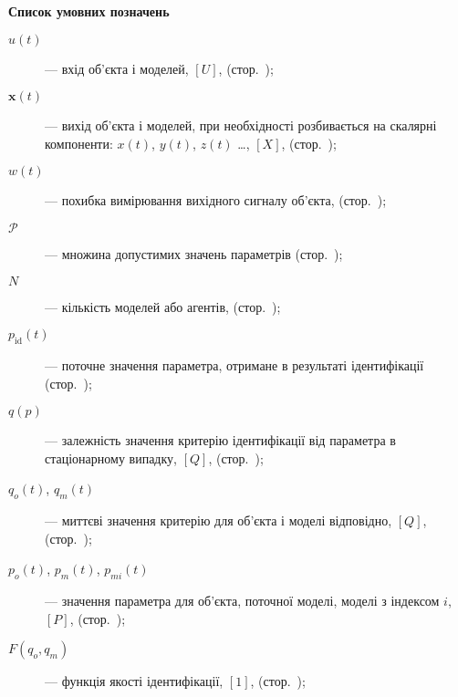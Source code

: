 \clearpage
{}

\begin{center}
\textbf{Список умовних позначень}
\end{center}


\begin{description}

  \item[$u(t)$]  ---
    вхід об'єкта і моделей,
    $[U]$, (стор.~\pageref{atu:d:u});

  \item[$\mathbf{x}(t)$]  ---
  вихід об'єкта і моделей, при необхідності розбивається на скалярні компоненти:
    $x(t)$, $y(t)$, $z(t)$ \ldots, $[X]$, (стор.~\pageref{atu:d:x});

  \item[$w(t)$]  ---
    похибка вимірювання вихідного сигналу об'єкта,
    (стор.~\pageref{atu:d:w});

  \item[$\mathcal{P}$] ---
    множина допустимих значень параметрів
    (стор.~\pageref{atu:d:p_set});

  \item[$N$]  ---
    кількість моделей або агентів,
    (стор.~\pageref{atu:d:N});

  \item[$p_\mathrm{id}(t)$ ] ---
    поточне значення параметра, отримане в результаті ідентифікації
    (стор.~\pageref{atu:d:p_id});

  \item[$q(p)$]  ---
    залежність значення критерію ідентифікації від параметра в стаціонарному випадку,
    $[Q]$, (стор.~\pageref{atu:d:q_p});

  \item[$q_o(t)$, $q_m(t)$]  ---
    миттєві значення критерію для об'єкта і моделі відповідно,
    $[Q]$, (стор.~\pageref{atu:d:q_o});

  \item[$p_o(t)$, $p_m(t)$, $p_{mi}(t)$]  ---
   значення параметра для об'єкта, поточної моделі, моделі з індексом
    $i$, $[P]$, (стор.~\pageref{atu:d:p_o});

  \item[$F(q_o,q_m) $]  ---
    функція якості ідентифікації,
    $[1]$, (стор.~\pageref{atu:d:F});


\end{description}
